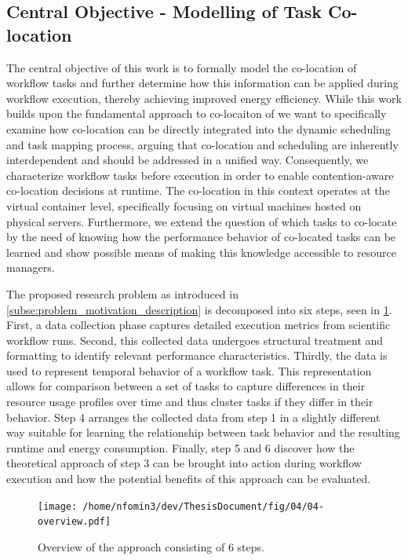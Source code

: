 \subsection{Central Objective - Modelling of Task Co-location}
\label{sec:problem_statement}
The central objective of this work is to formally model the co-location of workflow tasks and further determine how this information can be applied during workflow execution, thereby achieving improved energy efficiency.
While this work builds upon the fundamental approach to co-locaiton of \cite{5644899} we want to specifically examine how co-location can be directly integrated into the dynamic scheduling and task mapping process, arguing that co-location and scheduling are inherently interdependent and should be addressed in a unified way. Consequently, we characterize workflow tasks before execution in order to enable contention-aware co-location decisions at runtime. The co-location in this context operates at the virtual container level, specifically focusing on virtual machines hosted on physical servers. Furthermore, we extend the question of which tasks to co-locate by the need of knowing how the performance behavior of co-located tasks can be learned and show possible means of making this knowledge accessible to resource managers.

The proposed research problem as introduced in \ref{subse:problem_motivation_description} is decomposed into six steps, seen in \ref{fig:approach_overview}. First, a data collection phase captures detailed execution metrics from scientific workflow runs. Second, this collected data undergoes structural treatment and formatting to identify relevant performance characteristics. Thirdly, the data is used to represent temporal behavior of a workflow task. This representation allows for comparison between a set of tasks to capture differences in their resource usage profiles over time and thus cluster tasks if they differ in their behavior. Step 4 arranges the collected data from step 1 in a slightly different way suitable for learning the relationship between task behavior and the resulting runtime and energy consumption. Finally, step 5 and 6 discover how the theoretical approach of step 3 can be brought into action during workflow execution and how the potential benefits of this approach can be evaluated.

\begin{figure}[htbp]
    \centering
    \texttt{[image: /home/nfomin3/dev/ThesisDocument/fig/04/04-overview.pdf]} %
    \caption{Overview of the approach consisting of 6 steps.}
    \label{fig:approach_overview}
\end{figure}


